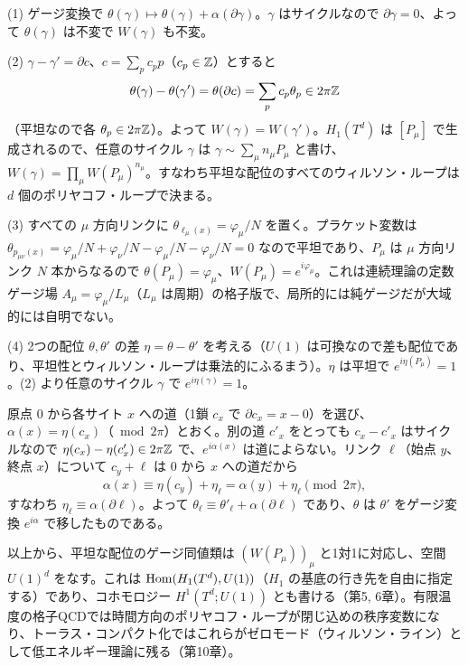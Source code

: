 \begin{solution}
(1) ゲージ変換で $\theta(\gamma)\mapsto\theta(\gamma)+\alpha(\partial\gamma)$。$\gamma$ はサイクルなので $\partial\gamma=0$、よって $\theta(\gamma)$ は不変で $W(\gamma)$ も不変。

(2) $\gamma-\gamma'=\partial c$、$c=\sum_pc_pp$（$c_p\in\mathbb{Z}$）とすると
\[
\theta(\gamma)-\theta(\gamma')=\theta(\partial c)=\sum_pc_p\theta_p\in2\pi\mathbb{Z}
\]
（平坦なので各 $\theta_p\in2\pi\mathbb{Z}$）。よって $W(\gamma)=W(\gamma')$。$H_1(T^d)$ は $[P_\mu]$ で生成されるので、任意のサイクル $\gamma$ は $\gamma\sim\sum_\mu n_\mu P_\mu$ と書け、$W(\gamma)=\prod_\mu W(P_\mu)^{n_\mu}$。すなわち平坦な配位のすべてのウィルソン・ループは $d$ 個のポリヤコフ・ループで決まる。

(3) すべての $\mu$ 方向リンクに $\theta_{\ell_\mu(x)}=\varphi_\mu/N$ を置く。プラケット変数は $\theta_{p_{\mu\nu}(x)}=\varphi_\mu/N+\varphi_\nu/N-\varphi_\mu/N-\varphi_\nu/N=0$ なので平坦であり、$P_\mu$ は $\mu$ 方向リンク $N$ 本からなるので $\theta(P_\mu)=\varphi_\mu$、$W(P_\mu)=e^{i\varphi_\mu}$。これは連続理論の定数ゲージ場 $A_\mu=\varphi_\mu/L_\mu$（$L_\mu$ は周期）の格子版で、局所的には純ゲージだが大域的には自明でない。

(4) 2つの配位 $\theta,\theta'$ の差 $\eta=\theta-\theta'$ を考える（$U(1)$ は可換なので差も配位であり、平坦性とウィルソン・ループは乗法的にふるまう）。$\eta$ は平坦で $e^{i\eta(P_\mu)}=1$。(2) より任意のサイクル $\gamma$ で $e^{i\eta(\gamma)}=1$。

原点 $0$ から各サイト $x$ への道（1鎖 $c_x$ で $\partial c_x=x-0$）を選び、$\alpha(x)=\eta(c_x)$（$\bmod 2\pi$）とおく。別の道 $c'_x$ をとっても $c_x-c'_x$ はサイクルなので $\eta(c_x)-\eta(c'_x)\in2\pi\mathbb{Z}$ で、$e^{i\alpha(x)}$ は道によらない。リンク $\ell$（始点 $y$、終点 $x$）について $c_y+\ell$ は $0$ から $x$ への道だから
\[
\alpha(x)\equiv\eta(c_y)+\eta_\ell=\alpha(y)+\eta_\ell\pmod{2\pi},
\]
すなわち $\eta_\ell\equiv\alpha(\partial\ell)$。よって $\theta_\ell\equiv\theta'_\ell+\alpha(\partial\ell)$ であり、$\theta$ は $\theta'$ をゲージ変換 $e^{i\alpha}$ で移したものである。

以上から、平坦な配位のゲージ同値類は $(W(P_\mu))_\mu$ と1対1に対応し、空間 $U(1)^d$ をなす。これは $\operatorname{Hom}(H_1(T^d),U(1))$（$H_1$ の基底の行き先を自由に指定する）であり、コホモロジー $H^1(T^d;U(1))$ とも書ける（第5, 6章）。有限温度の格子QCDでは時間方向のポリヤコフ・ループが閉じ込めの秩序変数になり、トーラス・コンパクト化ではこれらがゼロモード（ウィルソン・ライン）として低エネルギー理論に残る（第10章）。
\end{solution}

